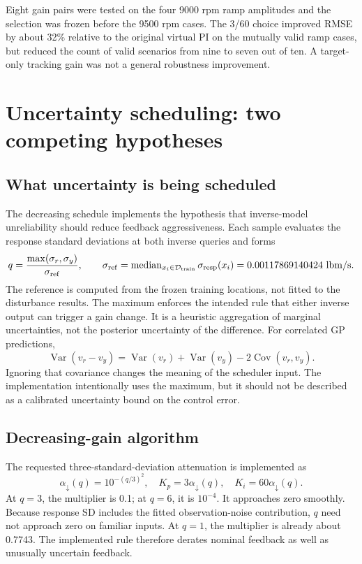 Eight gain pairs were tested on the four 9000 rpm ramp amplitudes and the selection was frozen before the 9500 rpm cases. The 3/60 choice improved RMSE by about 32\% relative to the original virtual PI on the mutually valid ramp cases, but reduced the count of valid scenarios from nine to seven out of ten. A target-only tracking gain was not a general robustness improvement.




\section{Uncertainty scheduling: two competing hypotheses}
\subsection{What uncertainty is being scheduled}
The decreasing schedule implements the hypothesis that inverse-model unreliability should reduce feedback aggressiveness. Each sample evaluates the response standard deviations at both inverse queries and forms
\begin{equation}
q=\frac{\max(\sigma_r,\sigma_y)}{\sigma_{\rm ref}},\qquad
\sigma_{\rm ref}=\operatorname{median}_{x_i\in\mathcal D_{\rm train}}\sigma_{\rm resp}(x_i)
=0.00117869140424\ \mathrm{lbm/s}.
\end{equation}
The reference is computed from the frozen training locations, not fitted to the disturbance results. The maximum enforces the intended rule that either inverse output can trigger a gain change. It is a heuristic aggregation of marginal uncertainties, not the posterior uncertainty of the difference. For correlated GP predictions,
\begin{equation}
\operatorname{Var}(v_r-v_y)=\operatorname{Var}(v_r)+\operatorname{Var}(v_y)-2\operatorname{Cov}(v_r,v_y).
\end{equation}
Ignoring that covariance changes the meaning of the scheduler input. The implementation intentionally uses the maximum, but it should not be described as a calibrated uncertainty bound on the control error.

\subsection{Decreasing-gain algorithm}
The requested three-standard-deviation attenuation is implemented as
\begin{equation}
\alpha_\downarrow(q)=10^{-(q/3)^2},\quad
K_p=3\alpha_\downarrow(q),\quad K_i=60\alpha_\downarrow(q).
\label{eq:down}
\end{equation}
At $q=3$, the multiplier is 0.1; at $q=6$, it is $10^{-4}$. It approaches zero smoothly. Because response SD includes the fitted observation-noise contribution, $q$ need not approach zero on familiar inputs. At $q=1$, the multiplier is already about 0.7743. The implemented rule therefore derates nominal feedback as well as unusually uncertain feedback.

